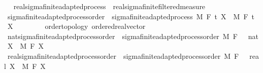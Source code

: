 \begin{isabellebody}
\isadelimproof
\ %
\endisadelimproof
%
\isatagproof
\isacommand{{\isachardot}{\kern0pt}{\isachardot}{\kern0pt}}\isamarkupfalse%
%
\endisatagproof
{\isafoldproof}%
%
\isadelimproof
%
\endisadelimproof
\isanewline
{}\isamarkupfalse%
\ real{\isacharunderscore}{\kern0pt}sigma{\isacharunderscore}{\kern0pt}finite{\isacharunderscore}{\kern0pt}adapted{\isacharunderscore}{\kern0pt}process\ {\isasymsubseteq}\ real{\isacharunderscore}{\kern0pt}sigma{\isacharunderscore}{\kern0pt}finite{\isacharunderscore}{\kern0pt}filtered{\isacharunderscore}{\kern0pt}measure%
\isadelimproof
\ %
\endisadelimproof
%
\isatagproof
\isacommand{{\isachardot}{\kern0pt}{\isachardot}{\kern0pt}}\isamarkupfalse%
%
\endisatagproof
{\isafoldproof}%
%
\isadelimproof
%
\endisadelimproof
\isanewline
\isanewline
{}\isamarkupfalse%
\ sigma{\isacharunderscore}{\kern0pt}finite{\isacharunderscore}{\kern0pt}adapted{\isacharunderscore}{\kern0pt}process{\isacharunderscore}{\kern0pt}order\ {\isacharequal}{\kern0pt}\ sigma{\isacharunderscore}{\kern0pt}finite{\isacharunderscore}{\kern0pt}adapted{\isacharunderscore}{\kern0pt}process\ M\ F\ t\ X\ \ M\ F\ t\ \ X\ {\isacharcolon}{\kern0pt}{\isacharcolon}{\kern0pt}\ {\isachardoublequoteopen}{\isacharunderscore}{\kern0pt}\ \ {\isasymRightarrow}\ {\isacharunderscore}{\kern0pt}\ {\isasymRightarrow}\ {\isacharunderscore}{\kern0pt}\ {\isacharcolon}{\kern0pt}{\isacharcolon}{\kern0pt}\ {\isacharbraceleft}{\kern0pt}order{\isacharunderscore}{\kern0pt}topology{\isacharcomma}{\kern0pt}\ ordered{\isacharunderscore}{\kern0pt}real{\isacharunderscore}{\kern0pt}vector{\isacharbraceright}{\kern0pt}{\isachardoublequoteclose}\ \isanewline
\isanewline
{}\isamarkupfalse%
\ nat{\isacharunderscore}{\kern0pt}sigma{\isacharunderscore}{\kern0pt}finite{\isacharunderscore}{\kern0pt}adapted{\isacharunderscore}{\kern0pt}process{\isacharunderscore}{\kern0pt}order\ {\isacharequal}{\kern0pt}\ sigma{\isacharunderscore}{\kern0pt}finite{\isacharunderscore}{\kern0pt}adapted{\isacharunderscore}{\kern0pt}process{\isacharunderscore}{\kern0pt}order\ M\ F\ {\isachardoublequoteopen}{}\ {\isacharcolon}{\kern0pt}{\isacharcolon}{\kern0pt}\ nat{\isachardoublequoteclose}\ X\ \ M\ F\ X\isanewline
{}\isamarkupfalse%
\ real{\isacharunderscore}{\kern0pt}sigma{\isacharunderscore}{\kern0pt}finite{\isacharunderscore}{\kern0pt}adapted{\isacharunderscore}{\kern0pt}process{\isacharunderscore}{\kern0pt}order\ {\isacharequal}{\kern0pt}\ sigma{\isacharunderscore}{\kern0pt}finite{\isacharunderscore}{\kern0pt}adapted{\isacharunderscore}{\kern0pt}process{\isacharunderscore}{\kern0pt}order\ M\ F\ {\isachardoublequoteopen}{}\ {\isacharcolon}{\kern0pt}{\isacharcolon}{\kern0pt}\ real{\isachardoublequoteclose}\ X\ \ M\ F\ X\isanewline

\end{isabellebody}
